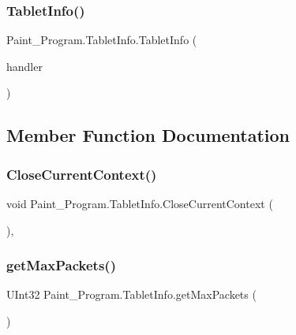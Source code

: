 \subsubsection{\texorpdfstring{Tablet\+Info()}{TabletInfo()}}
{\footnotesize\ttfamily Paint\+\_\+\+Program.\+Tablet\+Info.\+Tablet\+Info (\begin{DoxyParamCaption}\item[{Event\+Handler$<$ \mbox{\hyperlink{class_wintab_d_n_1_1_message_received_event_args}{Message\+Received\+Event\+Args}} $>$}]{handler }\end{DoxyParamCaption})\hspace{0.3cm}{\ttfamily [inline]}}



\subsection{Member Function Documentation}
\mbox{\label{class_paint___program_1_1_tablet_info_aff74e48af72f51c33129c437db898103}} 
\subsubsection{\texorpdfstring{Close\+Current\+Context()}{CloseCurrentContext()}}
{\footnotesize\ttfamily void Paint\+\_\+\+Program.\+Tablet\+Info.\+Close\+Current\+Context (\begin{DoxyParamCaption}{ }\end{DoxyParamCaption})\hspace{0.3cm}{\ttfamily [inline]}, {\ttfamily [private]}}

\mbox{\label{class_paint___program_1_1_tablet_info_a934c6f9d86beb999e083eb871dc59cc6}} 
\subsubsection{\texorpdfstring{get\+Max\+Packets()}{getMaxPackets()}}
{\footnotesize\ttfamily U\+Int32 Paint\+\_\+\+Program.\+Tablet\+Info.\+get\+Max\+Packets (\begin{DoxyParamCaption}{ }\end{DoxyParamCaption})\hspace{0.3cm}{\ttfamily [inline]}}

